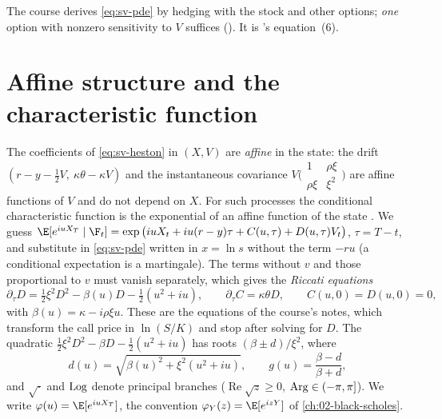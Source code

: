 The course derives \eqref{eq:sv-pde} by hedging with the stock and other options; \emph{one} option with
nonzero sensitivity to $V$ suffices (). It is \textcite{heston}'s equation~(6).

\section{Affine structure and the characteristic function}\label{sec:sv-cf}

The coefficients of \eqref{eq:sv-heston} in $(X,V)$ are \emph{affine} in the state: the drift
$(r-y-\frac12V,\ \kappa\theta-\kappa V)$ and the instantaneous covariance $V\big(\begin{smallmatrix}1&\rho\xi\\
\rho\xi&\xi^2\end{smallmatrix}\big)$ are affine functions of $V$ and do not depend on $X$. For such processes
the conditional characteristic function is the exponential of an affine function of the state
\citep{duffie-pan-singleton,duffie-filipovic-schachermayer}. We guess
$\E[e^{iuX_T}\mid\F_t]=\exp\big(iuX_t+iu(r-y)\tau+C(u,\tau)+D(u,\tau)V_t\big)$, $\tau=T-t$, and substitute in
\eqref{eq:sv-pde} written in $x=\ln s$ without the term $-ru$ (a conditional expectation is a martingale). The terms
without $v$ and those proportional to $v$ must vanish separately, which gives the \emph{Riccati equations}
\begin{equation}\label{eq:sv-riccati}
  \partial_\tau D=\tfrac12\xi^2D^2-\beta(u)D-\tfrac12(u^2+iu),\qquad\partial_\tau C=\kappa\theta D,\qquad
  C(u,0)=D(u,0)=0,
\end{equation}
with $\beta(u)=\kappa-i\rho\xi u$. These are the equations of the course's notes, which transform the call
price in $\ln(S/K)$ and stop after solving for $D$. The quadratic $\frac12\xi^2D^2-\beta D-\frac12(u^2+iu)$ has
roots $(\beta\pm d)/\xi^2$, where
\begin{equation}\label{eq:sv-d}
  d(u)=\sqrt{\beta(u)^2+\xi^2(u^2+iu)},\qquad g(u)=\frac{\beta-d}{\beta+d},
\end{equation}
and $\sqrt{\cdot}$ and $\operatorname{Log}$ denote principal branches ($\operatorname{Re}\sqrt z\ge0$, $\operatorname{Arg}\in(-\pi,\pi]$).
We write $\varphi(u)=\E[e^{iuX_T}]$, the convention $\varphi_Y(z)=\E[e^{izY}]$ of \cref{ch:02-black-scholes}.

